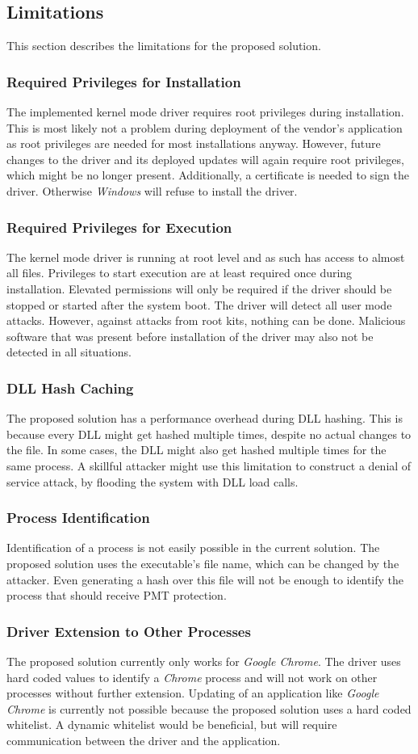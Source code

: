\subsection{Limitations}
This section describes the limitations for the proposed solution.
\subsubsection{Required Privileges for Installation}
The implemented kernel mode driver requires root privileges during installation. This is most likely not a problem during deployment of the vendor's application as root privileges are needed for most installations anyway. However, future changes to the driver and its deployed updates will again require root privileges, which might be no longer present. Additionally, a certificate is needed to sign the driver. Otherwise \emph{Windows} will refuse to install the driver.
\subsubsection{Required Privileges for Execution}
The kernel mode driver is running at root level and as such has access to almost all files. Privileges to start execution are at least required once during installation. Elevated permissions will only be required if the driver should be stopped or started after the system boot. The driver will detect all user mode attacks. However, against attacks from root kits, nothing can be done. Malicious software that was present before installation of the driver may also not be detected in all situations.
\subsubsection{DLL Hash Caching}
The proposed solution has a performance overhead during \gls{DLL} hashing. This is because every \gls{DLL} might get hashed multiple times, despite no actual changes to the file. In some cases, the \gls{DLL} might also get hashed multiple times for the same process. A skillful attacker might use this limitation to construct a denial of service attack, by flooding the system with DLL load calls.
\subsubsection{Process Identification}
Identification of a process is not easily possible in the current solution. The proposed solution uses the executable's file name, which can be changed by the attacker. Even generating a hash over this file will not be enough to identify the process that should receive \gls{PMT} protection. 
\subsubsection{Driver Extension to Other Processes}
The proposed solution currently only works for \emph{Google Chrome}. The driver uses hard coded values to identify a \emph{Chrome} process and will not work on other processes without further extension. Updating of an application like \emph{Google Chrome} is currently not possible because the proposed solution uses a hard coded whitelist. A dynamic whitelist would be beneficial, but will require communication between the driver and the application.